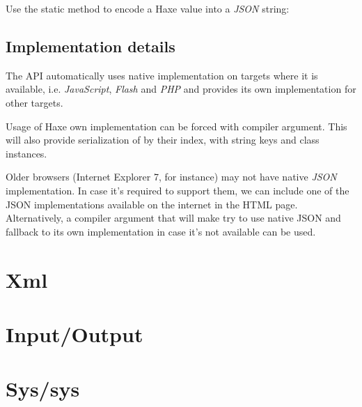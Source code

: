 Use the  static method to encode a Haxe value into a \emph{JSON} string:

\subsection{Implementation details}
\label{std-Json-implementation-details}

The  API automatically uses native implementation on targets where it is available, i.e. \emph{JavaScript}, \emph{Flash} and \emph{PHP} and provides its own implementation for other targets.

Usage of Haxe own implementation can be forced with  compiler argument. This will also provide serialization of  by their index,  with string keys and class instances.

Older browsers (Internet Explorer 7, for instance) may not have native \emph{JSON} implementation. In case it's required to support them, we can include one of the JSON implementations available on the internet in the HTML page. Alternatively, a  compiler argument that will make  try to use native JSON and fallback to its own implementation in case it's not available can be used.

\section{Xml}
\label{std-Xml}

\section{Input/Output}
\label{std-input-output}

\section{Sys/sys}
\label{std-sys}